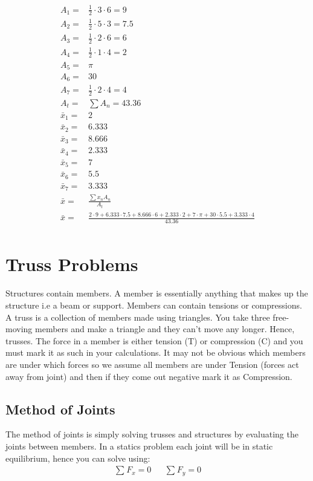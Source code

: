 \documentclass[a4paper, 12pt]{article}
\begin{document}
\begin{align*}
    A_1 = &\frac{1}{2} \cdot 3 \cdot 6 = 9\\
    A_2 = &\frac{1}{2} \cdot 5 \cdot 3 = 7.5\\
    A_3 = &\frac{1}{2} \cdot 2 \cdot 6 = 6\\
    A_4 = &\frac{1}{2} \cdot 1 \cdot 4 = 2\\
    A_5 = &\pi \\ 
    A_6 = &30 \\ 
    A_7 = &\frac{1}{2} \cdot 2 \cdot 4 = 4\\
    A_t = &\sum A_n = 43.36\\ 
    \bar{x}_1 = &2 \\
    \bar{x}_2 = &6.333 \\
    \bar{x}_3 = &8.666 \\
    \bar{x}_4 = &2.333 \\
    \bar{x}_5 = &7 \\
    \bar{x}_6 = &5.5 \\
    \bar{x}_7 = &3.333 \\
    \bar{x} = &\frac{\sum x_n A_n}{A_t} \\
    \bar{x} = &\frac{2 \cdot 9 + 6.333 \cdot 7.5 + 8.666 \cdot 6 + 2.333 \cdot 2 + 7 \cdot \pi + 30 \cdot 5.5 + 3.333 \cdot 4}{43.36} \\
\end{align*}

\section{Truss Problems}
Structures contain members. A member is essentially anything that makes up the structure i.e a beam or support. 
Members can contain tensions or compressions. A truss is a collection of members made using triangles. You take
three free-moving members and make a triangle and they can't move any longer. Hence, trusses. The force in a 
member is either tension (T) or compression (C) and you must mark it as such in your calculations. 
It may not be obvious which members are under which forces so we assume all members are under Tension 
(forces act away from joint) and then if they come out negative mark it as Compression. 

\subsection{Method of Joints}
The method of joints is simply solving trusses and structures by evaluating the joints between members. 
In a statics problem each joint will be in static equilibrium, hence you can solve using:
\begin{align*}
    \sum_{}F_x=0 && \sum_{}F_y=0  
\end{align*}
\end{document}
